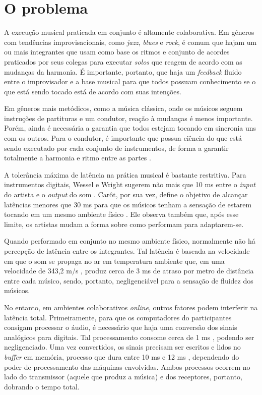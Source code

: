\section{O problema}
\label{sec:problem}

A execução musical praticada em conjunto é altamente colaborativa. Em gêneros com tendências improvisacionais, como \textit{jazz}, \textit{blues} e \textit{rock}, é comum que hajam um ou mais integrantes que usam como base os ritmos e conjunto de acordes praticados por seus colegas para executar \textit{solos} que reagem de acordo com as mudanças da harmonia. É importante, portanto, que haja um \textit{feedback} fluido entre o improvisador e a base musical para que todos possuam conhecimento se o que está sendo tocado está de acordo com suas intenções.

Em gêneros mais metódicos, como a música clássica, onde os músicos seguem instruções de partituras e um condutor, reação à mudanças é menos importante. Porém, ainda é necessária a garantia que todos estejam tocando em sincronia uns com os outros. Para o condutor, é importante que possua ciência do que está sendo executado por cada conjunto de instrumentos, de forma a garantir totalmente a harmonia e ritmo entre as partes \cite{conductor_role}.

A tolerância máxima de latência na prática musical é bastante restritiva. Para instrumentos digitais, Wessel e Wright sugerem não mais que 10 ms entre o \textit{input} do artista e o \textit{output} do som \cite{digital_instrument_latency}. Carôt, por sua vez, define o objetivo de alcançar latências menores que 30 ms para que os músicos tenham a sensação de estarem tocando em um mesmo ambiente físico \cite{carot_low_latency}. Ele observa também que, após esse limite, os artistas mudam a forma sobre como performam para adaptarem-se.

Quando performado em conjunto no mesmo ambiente físico, normalmente não há percepção de latência entre os integrantes. Tal latência é baseada na velocidade em que o som se propaga no ar em temperatura ambiente que, em uma velocidade de 343,2 m/s \cite{speed_of_sound}, produz cerca de 3 ms de atraso por metro de distância entre cada músico, sendo, portanto, negligenciável para a sensação de fluidez dos músicos.

No entanto, em ambientes colaborativos \textit{online}, outros fatores podem interferir na latência total. Primeiramente, para que os computadores do participantes consigam processar o áudio, é necessário que haja uma conversão dos sinais analógicos para digitais. Tal processamento consome cerca de 1 ms \cite{how_low_can_you_go}, podendo ser negligenciado. Uma vez convertidos, os sinais precisam ser escritos e lidos no \textit{buffer} em memória, processo que dura entre 10 ms e 12 ms \cite{how_low_can_you_go}, dependendo do poder de processamento das máquinas envolvidas. Ambos processos ocorrem no lado do transmissor (aquele que produz a música) e dos receptores, portanto, dobrando o tempo total.

